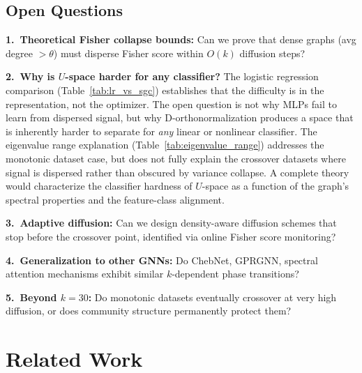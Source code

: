 \documentclass[11pt]{article}
\begin{document}
\subsection{Open Questions}

\textbf{1.\ Theoretical Fisher collapse bounds:} Can we prove that dense graphs
(avg degree $> \theta$) must disperse Fisher score within $O(k)$ diffusion steps?

\textbf{2.\ Why is $U$-space harder for any classifier?}
The logistic regression comparison (Table~\ref{tab:lr_vs_sgc}) establishes that
the difficulty is in the representation, not the optimizer.  The open question is
not why MLPs fail to learn from dispersed signal, but why D-orthonormalization
produces a space that is inherently harder to separate for \emph{any} linear or
nonlinear classifier.  The eigenvalue range explanation (Table~\ref{tab:eigenvalue_range})
addresses the monotonic dataset case, but does not fully explain the crossover
datasets where signal is dispersed rather than obscured by variance collapse.
A complete theory would characterize the classifier hardness of $U$-space
as a function of the graph's spectral properties and the feature-class alignment.

\textbf{3.\ Adaptive diffusion:} Can we design density-aware diffusion schemes that
stop before the crossover point, identified via online Fisher score monitoring?

\textbf{4.\ Generalization to other GNNs:} Do ChebNet, GPRGNN, spectral attention
mechanisms exhibit similar $k$-dependent phase transitions?

\textbf{5.\ Beyond $k{=}30$:} Do monotonic datasets eventually crossover at very
high diffusion, or does community structure permanently protect them?

\section{Related Work}
\label{sec:related}
\end{document}
